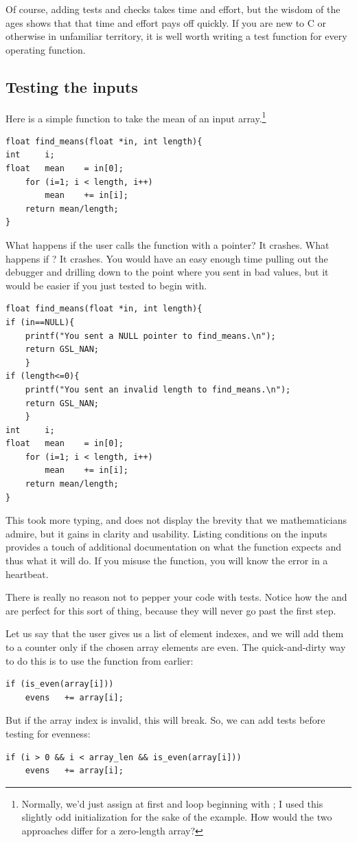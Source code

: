 \documentclass[12pt]{article}
\begin{document}
Of course, adding tests and checks takes time and effort, but the
wisdom of the ages shows that that time and effort pays off quickly.
If you are new to C or otherwise in unfamiliar territory, it is well
worth writing a test function for every operating function.


\subsection{Testing the inputs} Here is a simple function to take the
mean of an input array.\footnote{Normally, we'd just assign
 at first and loop beginning with ; I used this slightly odd initialization
for the sake of the example. How would the two approaches differ for a
zero-length array?}
\begin{lstlisting}
float find_means(float *in, int length){
int     i;
float   mean    = in[0];
    for (i=1; i < length, i++)
        mean    += in[i];
    return mean/length;
}
\end{lstlisting}

What happens if the user calls the function with a 
pointer? It crashes. What happens if ? It crashes.
You would have an easy enough time pulling out the debugger and drilling
down to the point where you sent in bad values, but it would be easier
if you just tested to begin with.
\begin{lstlisting}
float find_means(float *in, int length){
if (in==NULL){
    printf("You sent a NULL pointer to find_means.\n");
    return GSL_NAN;
    }
if (length<=0){
    printf("You sent an invalid length to find_means.\n");
    return GSL_NAN;
    }
int     i;
float   mean    = in[0];
    for (i=1; i < length, i++)
        mean    += in[i];
    return mean/length;
}
\end{lstlisting}
This took more typing, and does not display the brevity that we
mathematicians admire, but it gains in clarity and usability. Listing
conditions on the inputs provides a touch of additional documentation on
what the function expects and thus what it will do. If you misuse the
function, you will know the error in a heartbeat.

There is really no reason not to pepper your code with tests. Notice how
the \ci{\&\&} and \ci{||} are perfect for this sort of thing,
because they will never go past the first step. 

Let us say that the user gives us a list of element indexes, and we will
add them to a counter only if the chosen array elements are even. The
quick-and-dirty way to do this is to use the  function
from earlier:
\begin{lstlisting}
if (is_even(array[i]))
    evens   += array[i];
\end{lstlisting}
But if the array index is invalid, this will break. So, we can add tests
before testing for evenness:
\begin{lstlisting}
if (i > 0 && i < array_len && is_even(array[i]))
    evens   += array[i];
\end{lstlisting}
\end{document}
